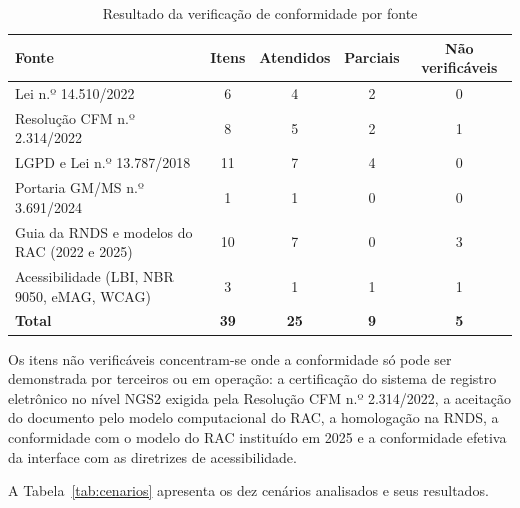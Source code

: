 \begin{table}[H]
\centering
\caption{Resultado da verificação de conformidade por fonte}
\label{tab:conformidade-resumo}
\footnotesize
\begin{tabular}{L{6.6cm} c c c c}
\toprule
\textbf{Fonte} & \textbf{Itens} & \textbf{Atendidos} & \textbf{Parciais} & \textbf{Não verificáveis} \\
\midrule
Lei n.º 14.510/2022 & 6 & 4 & 2 & 0 \\
Resolução CFM n.º 2.314/2022 & 8 & 5 & 2 & 1 \\
LGPD e Lei n.º 13.787/2018 & 11 & 7 & 4 & 0 \\
Portaria GM/MS n.º 3.691/2024 & 1 & 1 & 0 & 0 \\
Guia da RNDS e modelos do RAC (2022 e 2025) & 10 & 7 & 0 & 3 \\
Acessibilidade (LBI, NBR 9050, eMAG, WCAG) & 3 & 1 & 1 & 1 \\
\midrule
\textbf{Total} & \textbf{39} & \textbf{25} & \textbf{9} & \textbf{5} \\
\bottomrule
\end{tabular}
\end{table}

Os itens não verificáveis concentram-se onde a conformidade só pode ser demonstrada por terceiros ou em operação: a certificação do sistema de registro eletrônico no nível NGS2 exigida pela Resolução CFM n.º 2.314/2022, a aceitação do documento pelo modelo computacional do RAC, a homologação na RNDS, a conformidade com o modelo do RAC instituído em 2025 e a conformidade efetiva da interface com as diretrizes de acessibilidade.


A Tabela~\ref{tab:cenarios} apresenta os dez cenários analisados e seus resultados.

